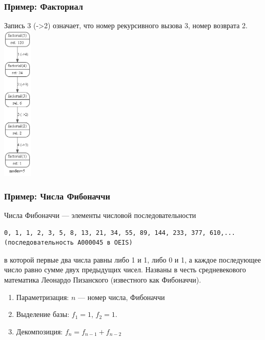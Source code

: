 \begin{frame}
\frametitle{Пример: Факториал}
\setlength{\columnsep}{-7cm}
\begin{multicols}{2}

Запись 3 (->2) означает, что номер рекурсивного вызова 3, номер возврата 2.
\columnbreak
\includegraphics[height=7.5cm, right]{images/factorial.png}
\end{multicols}

\end{frame}


\begin{frame}[fragile]
\frametitle{Пример: Числа Фибоначчи}

Числа Фибоначчи --- элементы числовой последовательности
\begin{verbatim}
0, 1, 1, 2, 3, 5, 8, 13, 21, 34, 55, 89, 144, 233, 377, 610,... 
(последовательность A000045 в OEIS)
\end{verbatim}
    
в которой первые два числа равны либо 1 и 1, либо 0 и 1, а каждое последующее число равно сумме двух предыдущих чисел. Названы в честь средневекового математика Леонардо Пизанского (известного как Фибоначчи). 
\begin{enumerate}
	\item Параметризация: $n$ --- номер числа, Фибоначчи
	\item Выделение базы: $f_1=1$, $f_2=1$.
	\item Декомпозиция: $f_n=f_{n-1}+f_{n-2}$
\end{enumerate}

\end{frame}


